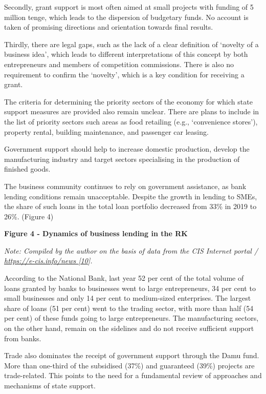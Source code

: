 Secondly, grant support is most often aimed at small projects with
funding of 5 million tenge, which leads to the dispersion of budgetary
funds. No account is taken of promising directions and orientation
towards final results.

Thirdly, there are legal gaps, such as the lack of a clear definition of
`novelty of a business idea', which leads to different interpretations
of this concept by both entrepreneurs and members of competition
commissions. There is also no requirement to confirm the `novelty',
which is a key condition for receiving a grant.

The criteria for determining the priority sectors of the economy for
which state support measures are provided also remain unclear. There are
plans to include in the list of priority sectors such areas as food
retailing (e.g., `convenience stores'), property rental, building
maintenance, and passenger car leasing.

Government support should help to increase domestic production, develop
the manufacturing industry and target sectors specialising in the
production of finished goods.

The business community continues to rely on government assistance, as
bank lending conditions remain unacceptable. Despite the growth in
lending to SMEs, the share of such loans in the total loan portfolio
decreased from 33\% in 2019 to 26\%. (Figure 4)

{\bfseries Figure 4 - Dynamics of business lending in the RK}

\emph{Note: Compiled by the author on the basis of data from the CIS
Internet portal /
\href{https://e-cis.info/news\%20\%5b10}{https://e-cis.info/news
{[}10}{]}.}

According to the National Bank, last year 52 per cent of the total
volume of loans granted by banks to businesses went to large
entrepreneurs, 34 per cent to small businesses and only 14 per cent to
medium-sized enterprises. The largest share of loans (51 per cent) went
to the trading sector, with more than half (54 per cent) of these funds
going to large entrepreneurs. The manufacturing sectors, on the other
hand, remain on the sidelines and do not receive sufficient support from
banks.

Trade also dominates the receipt of government support through the Damu
fund. More than one-third of the subsidised (37\%) and guaranteed (39\%)
projects are trade-related. This points to the need for a fundamental
review of approaches and mechanisms of state support.


